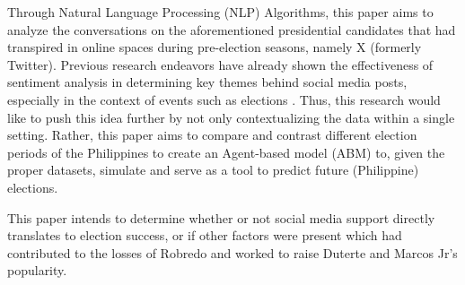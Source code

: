 Through Natural Language Processing (NLP) Algorithms, this paper aims to analyze the conversations on the aforementioned presidential candidates that had transpired in online spaces during pre-election seasons, namely X (formerly Twitter). Previous research endeavors have already shown the effectiveness of sentiment analysis in determining key themes behind social media posts, especially in the context of events such as elections \cite{Prasanthi-2023}. Thus, this research would like to push this idea further by not only contextualizing the data within a single setting. Rather, this paper aims to compare and contrast different election periods of the Philippines to create an Agent-based model (ABM) to, given the proper datasets, simulate and serve as a tool to predict future (Philippine) elections.

This paper intends to determine whether or not social media support directly translates to election success, or if other factors were present which had contributed to the losses of Robredo and worked to raise Duterte and Marcos Jr’s popularity.
